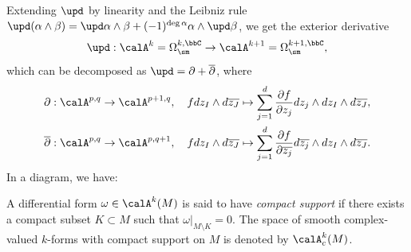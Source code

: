 Extending \(\upd\) by linearity and the Leibniz rule \(\upd(\alpha \wedge \beta) = \upd \alpha \wedge \beta + (-1)^{\deg \alpha} \alpha \wedge \upd \beta\), we get the exterior derivative
\[ \upd: \calA^k = \Omega_{\sm}^{k,\bbC} \to \calA^{k+1} = \Omega_{\sm}^{k+1,\bbC}, \]
which can be decomposed as \(\upd = \partial + \overline{\partial}\), where
\begin{align*}
	\partial: \calA^{p,q}            & \to \calA^{p+1,q}, \quad f d z_I \wedge d \overline{z_J} \mapsto \sum_{j=1}^d \frac{\partial f}{\partial z_j} d z_j \wedge d z_I \wedge d \overline{z_J},                       \\
	\overline{\partial}: \calA^{p,q} & \to \calA^{p,q+1}, \quad f d z_I \wedge d \overline{z_J} \mapsto \sum_{j=1}^d \frac{\partial f}{\partial \overline{z_j}} d \overline{z_j} \wedge d z_I \wedge d \overline{z_J}.
\end{align*}
In a diagram, we have:
\begin{center}
\end{center}

\begin{definition}\label{def:forms_with_compact_support}
	A differential form \(\omega \in \calA^{k}(M)\) is said to have \emph{compact support} if there exists a compact subset \(K \subset M\) such that \(\omega|_{M \setminus K} = 0\).
	The space of smooth complex-valued \(k\)-forms with compact support on \(M\) is denoted by \(\calA^{k}_c(M)\).
\end{definition}

